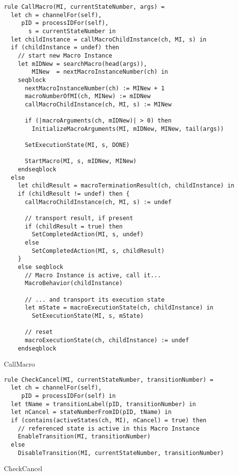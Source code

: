 \begin{listing}[H]
\begin{verbatim}
rule CallMacro(MI, currentStateNumber, args) =
  let ch = channelFor(self),
     pID = processIDFor(self),
       s = currentStateNumber in
  let childInstance = callMacroChildInstance(ch, MI, s) in
  if (childInstance = undef) then
    // start new Macro Instance
    let mIDNew = searchMacro(head(args)),
        MINew  = nextMacroInstanceNumber(ch) in
    seqblock
      nextMacroInstanceNumber(ch) := MINew + 1
      macroNumberOfMI(ch, MINew) := mIDNew
      callMacroChildInstance(ch, MI, s) := MINew

      if (|macroArguments(ch, mIDNew)| > 0) then
        InitializeMacroArguments(MI, mIDNew, MINew, tail(args))

      SetExecutionState(MI, s, DONE)

      StartMacro(MI, s, mIDNew, MINew)
    endseqblock
  else
    let childResult = macroTerminationResult(ch, childInstance) in
    if (childResult != undef) then {
      callMacroChildInstance(ch, MI, s) := undef

      // transport result, if present
      if (childResult = true) then
        SetCompletedAction(MI, s, undef)
      else
        SetCompletedAction(MI, s, childResult)
    }
    else seqblock
      // Macro Instance is active, call it...
      MacroBehavior(childInstance)

      // ... and transport its execution state
      let mState = macroExecutionState(ch, childInstance) in
        SetExecutionState(MI, s, mState)

      // reset
      macroExecutionState(ch, childInstance) := undef
    endseqblock
\end{verbatim}
\caption{CallMacro}
\label{lst:asm:CallMacro}
\end{listing}




\begin{listing}[H]
\begin{verbatim}
rule CheckCancel(MI, currentStateNumber, transitionNumber) =
  let ch = channelFor(self),
     pID = processIDFor(self) in
  let tName = transitionLabel(pID, transitionNumber) in
  let nCancel = stateNumberFromID(pID, tName) in
  if (contains(activeStates(ch, MI), nCancel) = true) then
    // referenced state is active in this Macro Instance
    EnableTransition(MI, transitionNumber)
  else
    DisableTransition(MI, currentStateNumber, transitionNumber)
\end{verbatim}
\caption{CheckCancel}
\label{lst:asm:CheckCancel}
\end{listing}




